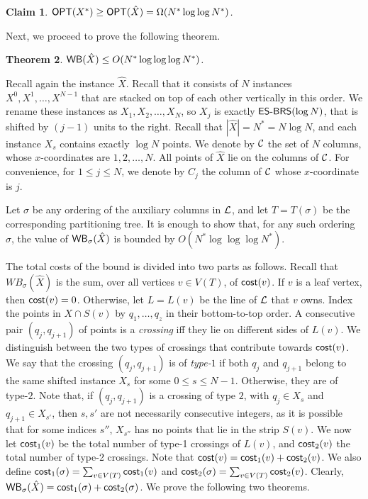 \documentclass[11pt]{article}
\numberwithin{equation}{section}
\newtheorem{theorem}{Theorem}[section]
\newtheorem{claim}[theorem]{Claim}
\theoremstyle{definition}
\theoremstyle{plain}
\begin{document}
\begin{claim}
	$\mbox{\sf OPT}(X^*)\geq \mbox{\sf OPT}(\hat{X})=\Omega(N^*\log\log N^*)$.
\end{claim}
%
%
%
%
%
%
%
%
%
%
%
%



%

%

Next, we proceed to prove the following theorem. 

\begin{theorem}\label{thm: bound for first final instance}
$\mathsf{WB}(\hat X)\leq O(N^*\log\log\log N^*)$.
\end{theorem}
 
Recall again the instance $\hat X$. Recall that it consists of $N$ instances $X^0,X^1,\ldots,X^{N-1}$ that are stacked on top of each other vertically in this order. 
We rename these instances as $X_1,X_2,\ldots,X_{N}$, so $X_j$ is exactly $\mbox{\sf{ES-BRS}}(\log N)$, that is shifted by $(j-1)$ units to the right. 
Recall that $|\hat X|=N^*=N\log N$, and each instance $X_s$ contains exactly $\log N$ points.
We denote by ${\mathcal C}$ the set of $N$ columns, whose $x$-coordinates are $1,2,\ldots,N$. 
All points of $\hat X$ lie on the columns of ${\mathcal C}$. For convenience, for $1\leq j\leq N$, we denote by $C_j$ the column of ${\mathcal C}$ whose $x$-coordinate is $j$.



Let $\sigma$ be any ordering of the auxiliary columns in ${\mathcal L}$, and let $T=T({\sigma})$ be the corresponding partitioning tree.
It is enough to show that, for any such ordering $\sigma$, the value of $\mathsf{WB}_{\sigma}(\hat{X})$ is bounded by $O(N^*\log\log\log N^*)$. %

The total costs of the bound is divided into two parts as follows. 
Recall that $WB_{\sigma}(\hat{X})$ is the sum, over all vertices $v\in V(T)$, of $\mathsf{cost}(v)$. 
If $v$ is a leaf vertex, then $\mathsf{cost}(v)=0$. Otherwise, let $L=L(v)$ be the line of ${\mathcal L}$ that $v$ owns.
Index the points in $X \cap S(v)$ by $q_1,\ldots, q_z$ in their bottom-to-top order.
A consecutive pair $(q_j, q_{j+1})$ of points is a \emph{crossing} iff they lie on different sides of $L(v)$.  
We distinguish between the two types of crossings that contribute towards $\mathsf{cost}(v)$. 
We say that the crossing $(q_j, q_{j+1})$ is of \emph{type-$1$} if both $q_j$ and $q_{j+1}$ belong to the same shifted instance $X_s$ for some $0\leq s\leq N-1$.
Otherwise, they are of type-$2$. 
Note that, if $(q_j,q_{j+1})$ is a crossing of type $2$, with $q_j\in X_s$ and $q_{j+1}\in X_{s'}$, then $s,s'$ are not necessarily consecutive integers, as it is possible that for some indices $s''$, $X_{s''}$ has no points that lie in the strip $S(v)$.
We now let $\mathsf{cost}_1(v)$ be the total number of type-1 crossings of $L(v)$, and $\mathsf{cost}_2(v)$ the total number of type-2 crossings. Note that $\mathsf{cost}(v)=\mathsf{cost}_1(v)+\mathsf{cost}_2(v)$. 
We also define $\mathsf{cost}_1(\sigma) = \sum_{v \in V(T)} \mathsf{cost}_1(v)$ and $\mathsf{cost}_2(\sigma) = \sum_{v \in V(T)} \mathsf{cost}_2(v)$. 
Clearly, $\mathsf{WB}_{\sigma}(\hat X)=\mathsf{cost}_1(\sigma)+\mathsf{cost}_2(\sigma)$. 
%
We  prove the following two theorems. %
\end{document}

